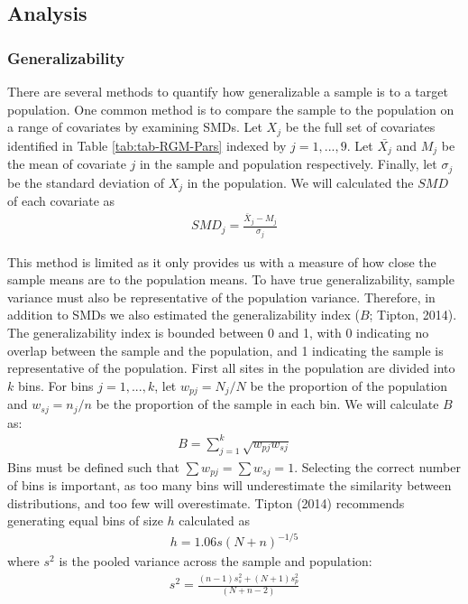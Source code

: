 \documentclass[man,floatsintext]{apa6}
\begin{document}
\hypertarget{analysis}{%
\subsection{Analysis}\label{analysis}}

\hypertarget{generalizability}{%
\subsubsection{Generalizability}\label{generalizability}}

There are several methods to quantify how generalizable a sample is to a target population. One common method is to compare the sample to the population on a range of covariates by examining SMDs. Let \(X_j\) be the full set of covariates identified in Table \ref{tab:tab-RGM-Pars} indexed by \(j = 1,...,9\). Let \(\bar{X_j}\) and \(M_j\) be the mean of covariate \(j\) in the sample and population respectively. Finally, let \(\sigma_j\) be the standard deviation of \(X_j\) in the population. We will calculated the \(SMD\) of each covariate as
\begin{align}
  SMD_{j} = \frac{\bar{X}_{j}-M_{j}}{\sigma_{j}}
\end{align}

This method is limited as it only provides us with a measure of how close the sample means are to the population means. To have true generalizability, sample variance must also be representative of the population variance. Therefore, in addition to SMDs we also estimated the generalizability index (\(B\); Tipton, 2014). The generalizability index is bounded between 0 and 1, with 0 indicating no overlap between the sample and the population, and 1 indicating the sample is representative of the population. First all sites in the population are divided into \(k\) bins. For bins \(j = 1,...,k\), let \(w_{pj} = N_j/N\) be the proportion of the population and \(w_{sj} = n_j/n\) be the proportion of the sample in each bin. We will calculate \(B\) as:
\begin{align}
  B = \sum^k_{j=1}\sqrt{w_{pj}w_{sj}}
\end{align}
Bins must be defined such that \(\sum{w_{pj}} = \sum{w_{sj}} = 1\). Selecting the correct number of bins is important, as too many bins will underestimate the similarity between distributions, and too few will overestimate. Tipton (2014) recommends generating equal bins of size \(h\) calculated as
\begin{align}
  h = 1.06s(N+n)^{-1/5}
\end{align}
where \(s^2\) is the pooled variance across the sample and population:
\begin{align}
  s^2 = \frac{(n - 1)s^2_s + (N + 1)s^2_p}{(N + n - 2)}
\end{align}
\end{document}
